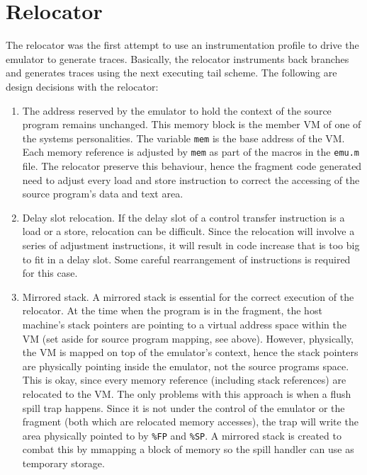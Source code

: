 \section{Relocator}
The relocator was the first attempt to use an instrumentation profile to drive
the emulator to generate traces.
Basically, the relocator instruments back branches and generates traces using 
the next executing tail scheme.
The following are design decisions with the relocator:

\begin{enumerate}
\item The address reserved by the emulator to hold the context of the source
program remains unchanged.  This memory block is the member VM of one of the
systems personalities.  
The variable \texttt{mem} is the base address of the VM.  
Each memory reference is adjusted by \texttt{mem} as part of the macros in 
the \texttt{emu.m} file.
The relocator preserve this behaviour, hence the fragment code generated need to
adjust every load and store instruction to correct the accessing of the source
program's data and text area.

\item Delay slot relocation.
If the delay slot of a control transfer instruction is a load or a store,
relocation can be difficult.  Since the relocation will involve a series of
adjustment instructions, it will result in code increase that is too big to fit
in a delay slot.  Some careful rearrangement of instructions is required for 
this case.

\item Mirrored stack.
A mirrored stack is essential for the correct execution of the relocator.  
At the time when the program is in the fragment, the host machine's stack
pointers are pointing to a virtual address space within the VM (set aside for
source program mapping, see above).  
However, physically, the VM is mapped on top of the emulator's context, hence 
the stack pointers are physically pointing inside the emulator, not the source
programs space.  This is okay, since every memory reference (including stack
references) are relocated to the VM.
The only problems with this approach is when a flush spill trap happens.  
Since it is not under the control of the emulator or the fragment (both which 
are relocated memory accesses), the trap will write the area physically pointed 
to by \texttt{\%FP} and \texttt{\%SP}.
A mirrored stack is created to combat this by mmapping a block of memory so the
spill handler can use as temporary storage.
\end{enumerate}


